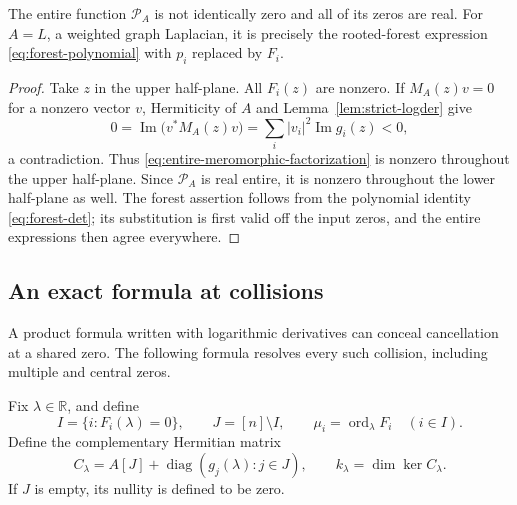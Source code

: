 \begin{theorem}\label{thm:entire-real-zeros}
The entire function $\mathcal P_A$ is not identically zero and all of
its zeros are real.
For $A=L$, a weighted graph Laplacian, it is precisely the rooted-forest
expression \eqref{eq:forest-polynomial} with $p_i$ replaced by $F_i$.
\end{theorem}
\begin{proof}
Take $z$ in the upper half-plane.  All $F_i(z)$ are nonzero.
If $M_A(z)v=0$ for a nonzero vector $v$, Hermiticity of $A$ and
Lemma~\ref{lem:strict-logder} give
\[
 0=\operatorname{Im}\bigl(v^*M_A(z)v\bigr)
   =\sum_i|v_i|^2\operatorname{Im}g_i(z)<0,
\]
a contradiction.  Thus \eqref{eq:entire-meromorphic-factorization}
is nonzero throughout the upper half-plane.  Since $\mathcal P_A$ is
real entire, it is nonzero throughout the lower half-plane as well.
The forest assertion follows from the polynomial identity
\eqref{eq:forest-det}; its substitution is first valid off the input
zeros, and the entire expressions then agree everywhere.
\end{proof}

\subsection{An exact formula at collisions}

A product formula written with logarithmic derivatives can conceal
cancellation at a shared zero.  The following formula resolves every
such collision, including multiple and central zeros.

Fix $\lambda\in\mathbb R$, and define
\[
 I=\{i:F_i(\lambda)=0\},\qquad J=[n]\setminus I,\qquad
 \mu_i=\operatorname{ord}_{\lambda}F_i\quad(i\in I).
\]
Define the complementary Hermitian matrix
\begin{equation}\label{eq:collision-complement}
 C_\lambda=A[J]+\operatorname{diag}(g_j(\lambda):j\in J),
 \qquad k_\lambda=\dim\ker C_\lambda.
\end{equation}
If $J$ is empty, its nullity is defined to be zero.

